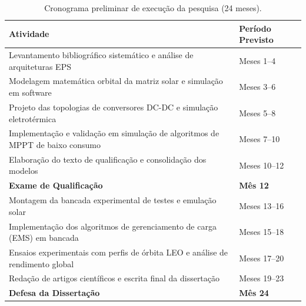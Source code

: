 \begin{table}[htbp]
\centering
\small
\caption{Cronograma preliminar de execução da pesquisa (24 meses).}
\begin{tabularx}{\textwidth}{X p{3.5cm}}
\toprule
\textbf{Atividade} & \textbf{Período Previsto} \\
\midrule
Levantamento bibliográfico sistemático e análise de arquiteturas EPS & Meses 1--4 \\
Modelagem matemática orbital da matriz solar e simulação em software & Meses 3--6 \\
Projeto das topologias de conversores DC-DC e simulação eletrotérmica & Meses 5--8 \\
Implementação e validação em simulação de algoritmos de MPPT de baixo consumo & Meses 7--10 \\
Elaboração do texto de qualificação e consolidação dos modelos & Meses 10--12 \\
\textbf{Exame de Qualificação} & \textbf{Mês 12} \\
\midrule
Montagem da bancada experimental de testes e emulação solar & Meses 13--16 \\
Implementação dos algoritmos de gerenciamento de carga (EMS) em bancada & Meses 15--18 \\
Ensaios experimentais com perfis de órbita LEO e análise de rendimento global & Meses 17--20 \\
Redação de artigos científicos e escrita final da dissertação & Meses 19--23 \\
\textbf{Defesa da Dissertação} & \textbf{Mês 24} \\
\bottomrule
\end{tabularx}
\label{tab:cronograma}
\end{table}